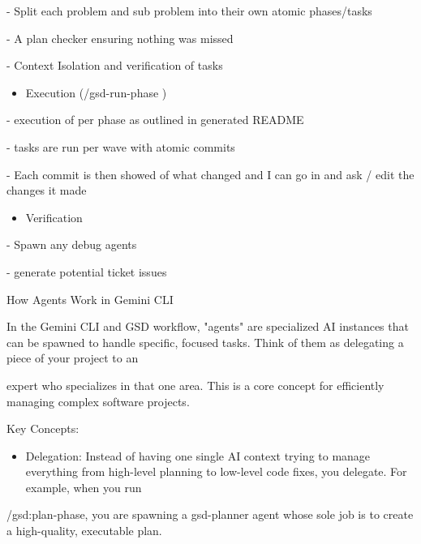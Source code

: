 - Split each problem and sub problem into their own atomic phases/tasks

- A plan checker ensuring nothing was missed

- Context Isolation and verification of tasks

\begin{itemize}
\item
  Execution (/gsd-run-phase )
\end{itemize}

- execution of per phase as outlined in generated README

- tasks are run per wave with atomic commits

- Each commit is then showed of what changed and I can go in and ask /
edit the changes it made

\begin{itemize}
\item
  Verification
\end{itemize}

- Spawn any debug agents

- generate potential ticket issues

How Agents Work in Gemini CLI

In the Gemini CLI and GSD workflow, "agents" are specialized AI
instances that can be spawned to handle specific, focused tasks. Think
of them as delegating a piece of your project to an

expert who specializes in that one area. This is a core concept for
efficiently managing complex software projects.

Key Concepts:

\begin{itemize}
\item
  Delegation: Instead of having one single AI context trying to manage
  everything from high-level planning to low-level code fixes, you
  delegate. For example, when you run
\end{itemize}

/gsd:plan-phase, you are spawning a gsd-planner agent whose sole job is
to create a high-quality, executable plan.

